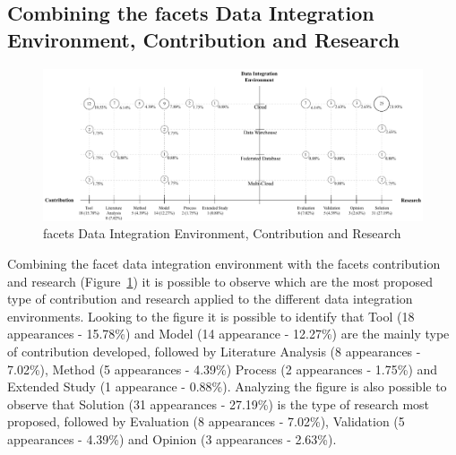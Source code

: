 \subsection{Combining the facets Data Integration Environment, Contribution and Research}

\begin{figure}[h]
\centering
\includegraphics[scale=0.48]{figs/bubble-charts/DI-Environment-Contribution-Research.pdf}
\caption{facets Data Integration Environment, Contribution and Research}\label{fig:facet2}
\end{figure}

Combining the facet data integration environment with the facets contribution and research 
(Figure~\ref{fig:facet2}) it is possible to observe which are the most proposed type of
contribution and research applied to the different data integration environments.  
Looking to the figure it is possible to identify that Tool (18 appearances - 15.78\%) and 
Model (14 appearance - 12.27\%) are the mainly type of contribution developed, 
followed by Literature Analysis (8 appearances - 7.02\%), Method (5 appearances - 4.39\%) 
Process (2 appearances - 1.75\%) and Extended Study (1 appearance - 0.88\%).
Analyzing the figure is also possible to observe that Solution (31 appearances - 27.19\%) is 
the type of research most proposed, 
followed by Evaluation (8 appearances - 7.02\%), Validation (5 appearances - 4.39\%) and
Opinion (3 appearances - 2.63\%).

 
% 
% 


